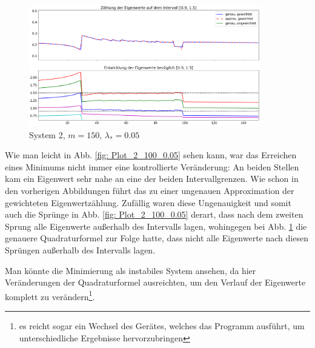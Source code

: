 \documentclass[a4paper,12pt]{report}
\newcommand{\1}{\mathds{1}}
\theoremstyle{plain} %
\theoremstyle{definition} %
\theoremstyle{remark}
\begin{document}
            \begin{figure}[h!t]
                  \centering
                  \includegraphics[width=0.9\textwidth, keepaspectratio]{./Original/Plot_2_150_0.05.png}
                  \caption{System 2, $m=150$, $\lambda_*=0.05$}
                  \label{fig: Plot_2_150_0.05}
            \end{figure}

            Wie man leicht in Abb. \ref{fig: Plot_2_100_0.05} sehen kann, war das Erreichen eines Minimums nicht immer eine kontrollierte Veränderung:
            An beiden Stellen kam ein Eigenwert sehr nahe an eine der beiden Intervallgrenzen. Wie schon in den vorherigen Abbildungen führt das zu einer ungenauen Approximation der gewichteten Eigenwertzählung.
            Zufällig waren diese Ungenauigkeit und somit auch die Sprünge in Abb. \ref{fig: Plot_2_100_0.05} derart, dass nach dem zweiten Sprung alle Eigenwerte außerhalb des Intervalls lagen,
            wohingegen bei Abb. \ref{fig: Plot_2_150_0.05} die genauere Quadraturformel zur Folge hatte, dass nicht alle Eigenwerte nach diesen Sprüngen außerhalb des Intervalls lagen.

            Man könnte die Minimierung als instabiles System ansehen, da hier Veränderungen der Quadraturformel ausreichten, um den Verlauf der Eigenwerte komplett zu verändern\footnote{es reicht sogar ein Wechsel des Gerätes, welches das Programm ausführt, um unterschiedliche Ergebnisse hervorzubringen}.
\end{document}
